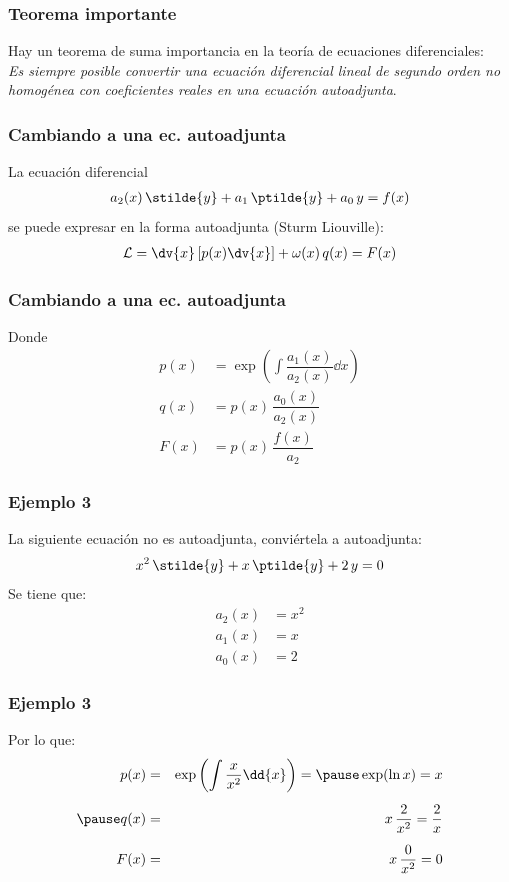 \begin{frame}
\frametitle{Teorema importante}
Hay un teorema de suma importancia en la teoría de ecuaciones diferenciales:
\\
\bigskip
\emph{Es siempre posible convertir una ecuación diferencial lineal de segundo orden no homogénea con coeficientes reales en una ecuación autoadjunta}.
\end{frame}
\begin{frame}
\frametitle{Cambiando a una ec. autoadjunta}
La ecuación diferencial
\begin{align*}
a_{2}(x) \, \stilde{y} + a_{1} \, \ptilde{y} + a_{0} \, y =  f(x)
\end{align*}
se puede expresar en la forma autoadjunta (Sturm Liouville):
\begin{align*}
\mathcal{L} = \dv{x} \left[ p(x) \dv{x} \right] + \omega (x) \, q(x) =  F(x)
\end{align*}    
\end{frame}
\begin{frame}
\frametitle{Cambiando a una ec. autoadjunta}
Donde 
\begin{align*}
p(x) &=  \exp\left( \int \dfrac{a_{1}(x)}{a_{2}(x)} \dd{x} \right) \\[0.5em]
q(x) &= p(x) \, \dfrac{a_{0}(x)}{a_{2}(x)} \\[0.5em]
F(x) &= p(x) \, \dfrac{f(x)}{a_{2}}
\end{align*}
\end{frame}
\begin{frame}
\frametitle{Ejemplo 3}
La siguiente ecuación no es autoadjunta, conviértela a autoadjunta:
\begin{align*}
x^{2} \, \stilde{y} + x \, \ptilde{y} + 2 \, y = 0
\end{align*}
\pause
Se tiene que:
\begin{align*}
a_{2}(x) &= x^{2} \\[0.5em]
a_{1}(x) &= x \\[0.5em]
a_{0}(x) &= 2
\end{align*}
\end{frame}
\begin{frame}
\frametitle{Ejemplo 3}
Por lo que:
\begin{eqnarray*}
p(x) &=&  \exp\left( \int \dfrac{x}{x^{2}} \dd{x} \right) = \pause \exp(\ln x) =  x \\[0.5em] \pause
q(x) &=& x \, \dfrac{2}{x^{2}} = \dfrac{2}{x} \\[0.5em]
F(x) &=& x \, \dfrac{0}{x^{2}} = 0
\end{eqnarray*}
\end{frame}
